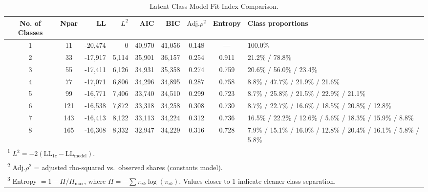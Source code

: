 \begin{table}[pos=H]
\selectfont
\caption{Latent Class Model Fit Index Comparison.}
\label{table:model_fit_comparison}
\begin{adjustbox}{width=\textwidth, center}

\begin{tabular}{ccrrrrccl}
\toprule
No. of Classes & Npar & LL & $L^2$ & AIC & BIC & $\text{Adj.}\rho^2$ & Entropy & Class proportions\\
\midrule
1 & 11 & -20,474 & 0 & 40,970 & 41,056 & 0.148 & --- & 100.0\%\\
2 & 33 & -17,917 & 5,114 & 35,901 & 36,157 & 0.254 & 0.911 & 21.2\% / 78.8\%\\
3 & 55 & -17,411 & 6,126 & 34,931 & 35,358 & 0.274 & 0.759 & 20.6\% / 56.0\% / 23.4\%\\
4 & 77 & -17,071 & 6,806 & 34,296 & 34,895 & 0.287 & 0.758 & 8.8\% / 47.7\% / 21.9\% / 21.6\%\\
5 & 99 & -16,771 & 7,406 & 33,740 & 34,510 & 0.299 & 0.723 & 8.7\% / 25.8\% / 21.5\% / 22.9\% / 21.1\%\\
6 & 121 & -16,538 & 7,872 & 33,318 & 34,258 & 0.308 & 0.730 & 8.7\% / 22.7\% / 16.6\% / 18.5\% / 20.8\% / 12.8\%\\
7 & 143 & -16,413 & 8,122 & 33,113 & 34,224 & 0.312 & 0.736 & 16.5\% / 22.2\% / 12.6\% / 5.6\% / 18.3\% / 15.9\% / 8.8\%\\
8 & 165 & -16,308 & 8,332 & 32,947 & 34,229 & 0.316 & 0.728 & 7.9\% / 15.1\% / 16.0\% / 12.8\% / 20.4\% / 16.1\% / 5.8\% / 5.8\%\\
\bottomrule
\multicolumn{9}{l}{\rule{0pt}{1em}\textsuperscript{1} $L^2 = -2(\text{LL}_{1c} - \text{LL}_{\text{model}})$.}\\
\multicolumn{9}{l}{\rule{0pt}{1em}\textsuperscript{2} $\text{Adj.}\rho^2$ = adjusted rho-squared vs.\ observed shares (constants model).}\\
\multicolumn{9}{l}{\rule{0pt}{1em}\textsuperscript{3} Entropy $= 1 - H/H_{\max}$, where $H = -\sum \pi_{ik}\log(\pi_{ik})$. Values closer to 1 indicate cleaner class separation.}\\
\end{tabular}
\end{adjustbox}
\end{table}
